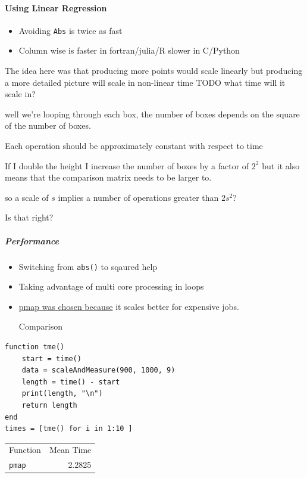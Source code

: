 \documentclass[11pt]{article}
\begin{document}
\paragraph{Using Linear Regression}
\label{sec:org2b6e981}
\begin{itemize}
\item Avoiding \texttt{Abs} is twice as fast
\item Column wise is faster in fortran/julia/R slower in C/Python
\end{itemize}

The idea here was that producing more points would scale linearly but producing a more detailed picture will scale in non-linear time TODO what time will it scale in?

well we're looping through each box, the number of boxes depends on the square of the number of boxes.

Each operation should be approximately constant with respect to time

If I double the height I increase the number of boxes by a factor of \(2^{2}\) but it also means that the comparison matrix needs to be larger to.

so a scale of \(s\) implies a number of operations greater than \(2s^{2}\)?

Is that right?
\subparagraph{Performance}
\label{sec:org8a588d7}
\begin{itemize}
\item Switching from \texttt{abs()} to sqaured help
\item Taking advantage of multi core processing in loops

\item \href{https://stackoverflow.com/a/55704326/12843551}{pmap was chosen because} it scales better for expensive jobs.

Comparison
\end{itemize}
\lstset{language=julia,label= ,caption= ,captionpos=b,numbers=none}
\begin{lstlisting}
function tme()
    start = time()
    data = scaleAndMeasure(900, 1000, 9)
    length = time() - start
    print(length, "\n")
    return length
end
times = [tme() for i in 1:10 ]
\end{lstlisting}

\begin{center}
\begin{tabular}{lr}
Function & Mean Time\\
\texttt{pmap} & 2.2825\\
\end{tabular}
\end{center}
\end{document}
